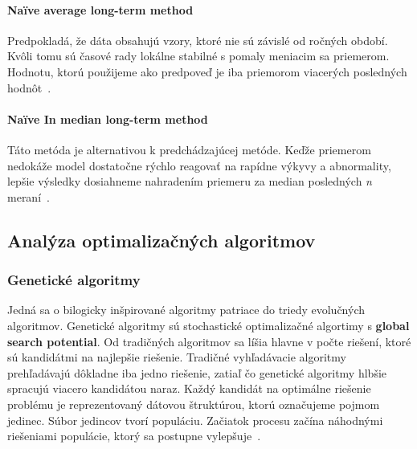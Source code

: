\documentclass[a4paper,slovak,12pt,appendix]{article}
\begin{document}
\paragraph{Naïve average long-term method}
Predpokladá, že dáta obsahujú vzory, ktoré nie sú závislé od ročných období.
Kvôli tomu sú časové rady lokálne stabilné s pomaly meniacim sa priemerom.
Hodnotu, ktorú použijeme ako predpoveď je iba priemorom viacerých posledných
hodnôt~\cite{Grmanova2016}.

\paragraph{Naïve In median long-term method}
Táto metóda je alternativou k predchádzajúcej metóde. Keďže priemerom nedokáže
model dostatočne rýchlo reagovať na rapídne výkyvy a abnormality, lepšie
výsledky dosiahneme nahradením priemeru za median posledných \textit{n}
meraní~\cite{Grmanova2016}.


\subsection{Analýza optimalizačných algoritmov}




\subsubsection{Genetické algoritmy}
Jedná sa o bilogicky inšpirované algoritmy patriace do triedy
evolučných algoritmov. Genetické algoritmy sú stochastické optimalizačné
algortimy s \textbf{global search potential}. Od tradičných algoritmov sa líšia
hlavne v počte riešení, ktoré sú kandidátmi na najlepšie riešenie. Tradičné
vyhľadávacie algoritmy prehľadávajú dôkladne iba jedno riešenie, zatiaľ čo
genetické algoritmy hlbšie spracujú viacero kandidátou naraz. Každý kandidát na
optimálne riešenie problému je reprezentovaný dátovou štruktúrou, ktorú
označujeme pojmom jedinec. Súbor jedincov tvorí populáciu. Začiatok procesu
začína náhodnými riešeniami populácie, ktorý sa postupne
vylepšuje~\cite{Chavan2015}.
\end{document}

